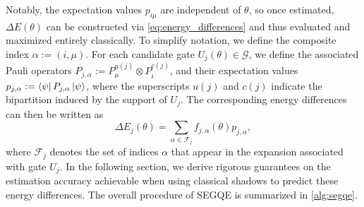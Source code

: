     Notably, the expectation values $p_{i\mu}$ are independent of $\theta$, so once estimated, $\Delta E(\theta)$ can be constructed via \cref{eq:energy_differences} and thus evaluated and maximized entirely classically. To simplify notation, we define the composite index $\alpha:=(i,\mu)$. For each candidate gate $U_j(\theta)\in\mathcal{G}$, we define the associated Pauli operators $P_{j,\alpha}:=P^{u(j)}_\mu \otimes P^{c(j)}_i$, and their expectation values $p_{j,\alpha}:=\bra{\psi}P_{j,\alpha}\ket{\psi}$, where the superscripts $u(j)$ and $c(j)$ indicate the bipartition induced by the support of $U_j$. The corresponding energy differences can then be written as
    \begin{equation}
        \Delta E_j(\theta) =\sum_{\alpha\in \mathcal{F}_j}f_{j,\alpha}(\theta)p_{j,\alpha}, 
    \end{equation}
    where $\mathcal{F}_j$ denotes the set of indices $\alpha$ that appear in the expansion associated with gate $U_j$. 
    In the following section, we derive rigorous guarantees on the estimation accuracy achievable when using classical shadows to predict these energy differences. The overall procedure of SEGQE is summarized in \cref{alg:segqe}.






